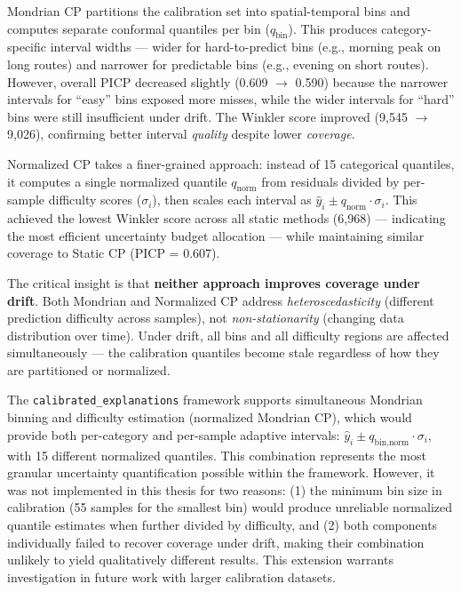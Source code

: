 Mondrian CP partitions the calibration set into spatial-temporal bins and computes separate conformal quantiles per bin ($q_{\text{bin}}$). This produces category-specific interval widths — wider for hard-to-predict bins (e.g., morning peak on long routes) and narrower for predictable bins (e.g., evening on short routes). However, overall PICP decreased slightly (0.609 $\to$ 0.590) because the narrower intervals for ``easy'' bins exposed more misses, while the wider intervals for ``hard'' bins were still insufficient under drift. The Winkler score improved (9,545 $\to$ 9,026), confirming better interval \emph{quality} despite lower \emph{coverage}.

Normalized CP takes a finer-grained approach: instead of 15 categorical quantiles, it computes a single normalized quantile $q_{\text{norm}}$ from residuals divided by per-sample difficulty scores ($\sigma_i$), then scales each interval as $\hat{y}_i \pm q_{\text{norm}} \cdot \sigma_i$. This achieved the lowest Winkler score across all static methods (6,968) — indicating the most efficient uncertainty budget allocation — while maintaining similar coverage to Static CP (PICP = 0.607).

The critical insight is that \textbf{neither approach improves coverage under drift}. Both Mondrian and Normalized CP address \emph{heteroscedasticity} (different prediction difficulty across samples), not \emph{non-stationarity} (changing data distribution over time). Under drift, all bins and all difficulty regions are affected simultaneously — the calibration quantiles become stale regardless of how they are partitioned or normalized.

The \texttt{calibrated\_explanations} framework supports simultaneous Mondrian binning and difficulty estimation (normalized Mondrian CP), which would provide both per-category and per-sample adaptive intervals: $\hat{y}_i \pm q_{\text{bin,norm}} \cdot \sigma_i$, with 15 different normalized quantiles. This combination represents the most granular uncertainty quantification possible within the framework. However, it was not implemented in this thesis for two reasons: (1) the minimum bin size in calibration (55 samples for the smallest bin) would produce unreliable normalized quantile estimates when further divided by difficulty, and (2) both components individually failed to recover coverage under drift, making their combination unlikely to yield qualitatively different results. This extension warrants investigation in future work with larger calibration datasets.

